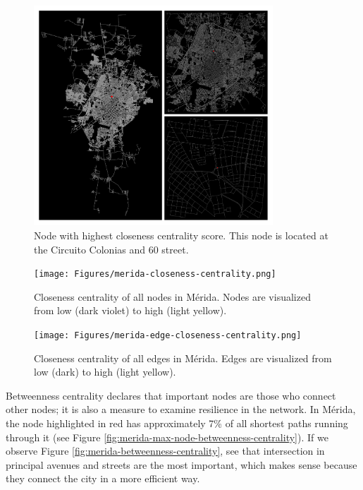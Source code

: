 \begin{figure}[h!]
	\centering
	\includegraphics[width=0.8\textwidth]{Figures/merida-node-closeness-centrality.png}
	\caption{Node with highest closeness centrality score. This node is located at the Circuito Colonias and 60 street.
		\label{fig:merida-max-node-closeness-centrality}}
\end{figure}

\begin{figure}[h!]
	\centering
	\texttt{[image: Figures/merida-closeness-centrality.png]}
	\caption{Closeness centrality of all nodes in Mérida. Nodes are visualized from low (dark violet) to high (light yellow).
		\label{fig:merida-closeness-centrality}}
\end{figure}

\begin{figure}[h!]
	\centering
	\texttt{[image: Figures/merida-edge-closeness-centrality.png]}
	\caption{Closeness centrality of all edges in Mérida. Edges are visualized from low (dark) to high (light yellow).
		\label{fig:merida-edge-closeness-centrality}}
\end{figure}

Betweenness centrality declares that important nodes are those who connect other nodes; it is also a measure to examine resilience in the network. In Mérida, the node highlighted in red has approximately 7\% of all shortest paths running through it (see Figure \ref{fig:merida-max-node-betweenness-centrality}). If we observe Figure \ref{fig:merida-betweenness-centrality}, see that intersection in principal avenues and streets are the most important, which makes sense because they connect the city in a more efficient way.

